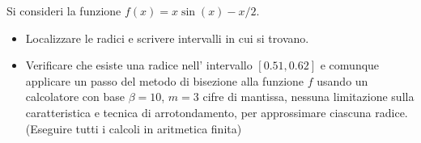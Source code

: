 Si consideri la funzione $f(x)=x \sin(x)-x/2$.
\begin{itemize}
\item  Localizzare le radici e
scrivere intervalli in cui si trovano.
\item Verificare che esiste una radice nell' intervallo $[0.51, 0.62]$ e comunque applicare un passo del
metodo di bisezione alla funzione $f$ usando un calcolatore con
base $\beta =10$, $m=3$ cifre di mantissa, nessuna limitazione
sulla caratteristica e tecnica di arrotondamento, per approssimare
ciascuna radice. (Eseguire tutti i calcoli in aritmetica finita)
\end{itemize}
